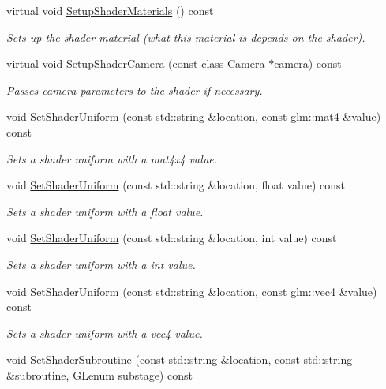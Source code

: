 \begin{DoxyCompactItemize}
virtual void \hyperlink{class_shader_program_ad7a595a10717c6051d6c582c850c4ed7}{Setup\+Shader\+Materials} () const 
\begin{DoxyCompactList}\small\item\em Sets up the shader material (what this material is depends on the shader). \end{DoxyCompactList}\item 
virtual void \hyperlink{class_shader_program_a75e888f885b9028847e2d9556a754170}{Setup\+Shader\+Camera} (const class \hyperlink{class_camera}{Camera} $\ast$camera) const 
\begin{DoxyCompactList}\small\item\em Passes camera parameters to the shader if necessary. \end{DoxyCompactList}\item 
void \hyperlink{class_shader_program_a47298abb4ffc8d75f88b3d603aa989f9}{Set\+Shader\+Uniform} (const std\+::string \&location, const glm\+::mat4 \&value) const 
\begin{DoxyCompactList}\small\item\em Sets a shader uniform with a mat4x4 value. \end{DoxyCompactList}\item 
void \hyperlink{class_shader_program_a3a4c9cd6967787bded962acd7ce6b3c6}{Set\+Shader\+Uniform} (const std\+::string \&location, float value) const 
\begin{DoxyCompactList}\small\item\em Sets a shader uniform with a float value. \end{DoxyCompactList}\item 
void \hyperlink{class_shader_program_a93e7090cc8ff284bfcde6ae972aa5b9e}{Set\+Shader\+Uniform} (const std\+::string \&location, int value) const 
\begin{DoxyCompactList}\small\item\em Sets a shader uniform with a int value. \end{DoxyCompactList}\item 
void \hyperlink{class_shader_program_a08b8936758c067aad38e6cd94608663f}{Set\+Shader\+Uniform} (const std\+::string \&location, const glm\+::vec4 \&value) const 
\begin{DoxyCompactList}\small\item\em Sets a shader uniform with a vec4 value. \end{DoxyCompactList}\item 
void \hyperlink{class_shader_program_ae2e00fa2f9107b34c758996021574b15}{Set\+Shader\+Subroutine} (const std\+::string \&location, const std\+::string \&subroutine, G\+Lenum substage) const 

\end{DoxyCompactItemize}
